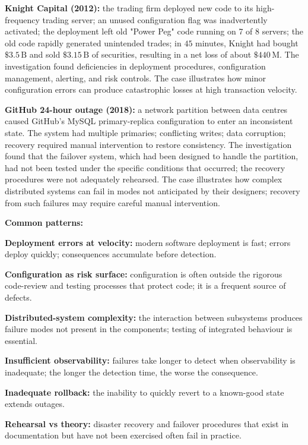\textbf{Knight Capital (2012):} the trading firm deployed new code to its high-frequency trading server; an unused configuration flag was inadvertently activated; the deployment left old "Power Peg" code running on 7 of 8 servers; the old code rapidly generated unintended trades; in $45$ minutes, Knight had bought $\$3.5\,\text{B}$ and sold $\$3.15\,\text{B}$ of securities, resulting in a net loss of about $\$440\,\text{M}$. The investigation found deficiencies in deployment procedures, configuration management, alerting, and risk controls. The case illustrates how minor configuration errors can produce catastrophic losses at high transaction velocity.

\textbf{GitHub 24-hour outage (2018):} a network partition between data centres caused GitHub's MySQL primary-replica configuration to enter an inconsistent state. The system had multiple primaries; conflicting writes; data corruption; recovery required manual intervention to restore consistency. The investigation found that the failover system, which had been designed to handle the partition, had not been tested under the specific conditions that occurred; the recovery procedures were not adequately rehearsed. The case illustrates how complex distributed systems can fail in modes not anticipated by their designers; recovery from such failures may require careful manual intervention.

\textbf{Common patterns:}

\textbf{Deployment errors at velocity:} modern software deployment is fast; errors deploy quickly; consequences accumulate before detection.

\textbf{Configuration as risk surface:} configuration is often outside the rigorous code-review and testing processes that protect code; it is a frequent source of defects.

\textbf{Distributed-system complexity:} the interaction between subsystems produces failure modes not present in the components; testing of integrated behaviour is essential.

\textbf{Insufficient observability:} failures take longer to detect when observability is inadequate; the longer the detection time, the worse the consequence.

\textbf{Inadequate rollback:} the inability to quickly revert to a known-good state extends outages.

\textbf{Rehearsal vs theory:} disaster recovery and failover procedures that exist in documentation but have not been exercised often fail in practice.

